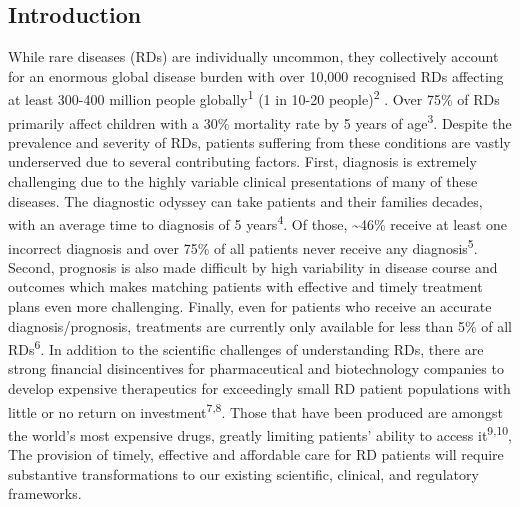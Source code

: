 \documentclass[
]{agujournal2019}
\begin{document}
\subsection{Introduction}\label{sec-introduction}

While rare diseases (RDs) are individually uncommon, they collectively
account for an enormous global disease burden with over 10,000
recognised RDs affecting at least 300-400 million people
globally\textsuperscript{1} (1 in 10-20 people)\textsuperscript{2} .
Over 75\% of RDs primarily affect children with a 30\% mortality rate by
5 years of age\textsuperscript{3}. Despite the prevalence and severity
of RDs, patients suffering from these conditions are vastly underserved
due to several contributing factors. First, diagnosis is extremely
challenging due to the highly variable clinical presentations of many of
these diseases. The diagnostic odyssey can take patients and their
families decades, with an average time to diagnosis of 5
years\textsuperscript{4}. Of those, \textasciitilde46\% receive at least
one incorrect diagnosis and over 75\% of all patients never receive any
diagnosis\textsuperscript{5}. Second, prognosis is also made difficult
by high variability in disease course and outcomes which makes matching
patients with effective and timely treatment plans even more
challenging. Finally, even for patients who receive an accurate
diagnosis/prognosis, treatments are currently only available for less
than 5\% of all RDs\textsuperscript{6}. In addition to the scientific
challenges of understanding RDs, there are strong financial
disincentives for pharmaceutical and biotechnology companies to develop
expensive therapeutics for exceedingly small RD patient populations with
little or no return on investment\textsuperscript{7,8}. Those that have
been produced are amongst the world's most expensive drugs, greatly
limiting patients' ability to access it\textsuperscript{9,10}, The
provision of timely, effective and affordable care for RD patients will
require substantive transformations to our existing scientific,
clinical, and regulatory frameworks.
\end{document}
